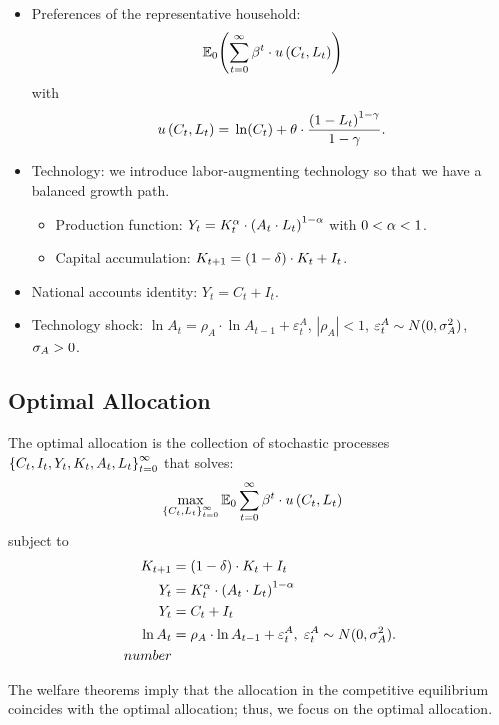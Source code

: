 \documentclass[letterpaper,12pt,leqno]{article}
\begin{document}
\begin{itemize}
\item Preferences of the representative household: \[\E[0]{\sum_{t=0}^{\infty}\b^t \cdot u\bp{C_{t},L_{t}}
}\]with \[u\bp{C_{t},L_{t}} =\ln{C_{t}}  +\t \cdot \frac{\bp{1-L_{t}}^{1-\g}}{1-\g}.\]
\item Technology: we introduce labor-augmenting technology so that we have a balanced growth path.
\begin{itemize}
\item Production function: $Y_{t}=K_{t}^{\alpha} \cdot \left( A_{t} \cdot L_{t} \right)^{1-\alpha}$ with $0<\alpha<1$.
\item Capital accumulation: $K_{t+1}=\left( 1-\delta \right)\cdot K_{t}+I_{t}$.
\end{itemize}
\item National accounts identity: $Y_{t} =C_{t}+I_{t}$.
\item Technology shock: $\ln A_{t} =\rho_{A}\cdot \ln A_{t-1} +\varepsilon^{A}_{t}$, $|\rho_{A}|<1$, $\varepsilon^{A}_{t}\sim N(0,\sigma_{A}^{2})$, $\sigma_{A}>0$.
\end{itemize}


\subsection{Optimal Allocation}

\begin{definition} The optimal allocation is the collection of stochastic processes $\left\lbrace C_{t},I_{t},Y_{t},K_{t},A_{t},L_{t} \right\rbrace_{t=0}^{\infty}$ that solves:
\begin{align*}
\max_{\bc{C_{t},L_{t}}_{t=0}^{\infty}}&\E_{0} \sum_{t=0}^{\infty}\b^{t}\cdot u\bp{C_{t},L_{t}}
\end{align*}
subject to
\begin{align}
K_{t+1} &=(1-\d)  \cdot K_{t}+I_{t}\label{eq:rbc1}\\
Y_{t}&=K_{t}^{\a}\cdot \bp{A_{t} \cdot L_{t}}^{1-\a}\label{eq:rbc2}\\
Y_{t}&=C_{t}+I_{t}\label{eq:rbc3}\\
\ln A_{t} &=\rho_{A}\cdot \ln A_{t-1} +\varepsilon^{A}_{t},\;\varepsilon^{A}_{t}\sim N(0,\s_{A}^{2}).\nonumber\\number
\end{align}
\end{definition}
The welfare theorems imply that the allocation in the competitive equilibrium coincides with the optimal allocation; thus, we focus on the optimal allocation.
\end{document}
